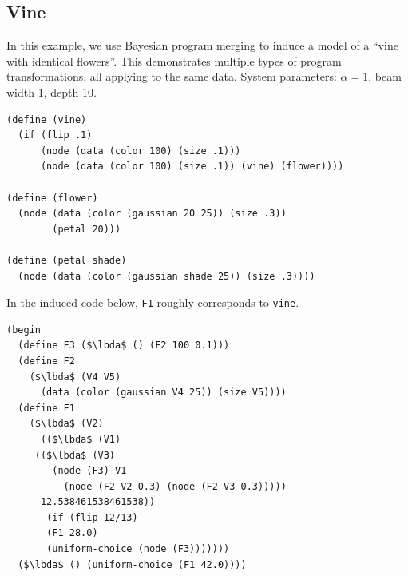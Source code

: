 \documentclass[a4paper,10pt]{article}
\newcommand{\lbda}{\color[rgb]{0,.3,.7} \lambda}
\begin{document}
\subsection{Vine}
In this example, we use Bayesian program merging to induce a model of a ``vine with identical flowers''. This demonstrates multiple types of program transformations, all applying to the same data. System parameters: $\alpha=1$, beam width 1, depth 10.
\begin{lstlisting}[mathescape=true]
(define (vine)
  (if (flip .1)
      (node (data (color 100) (size .1)))
      (node (data (color 100) (size .1)) (vine) (flower))))

(define (flower)
  (node (data (color (gaussian 20 25)) (size .3))
        (petal 20)))

(define (petal shade)
  (node (data (color (gaussian shade 25)) (size .3))))
\end{lstlisting}
In the induced code below, \texttt{F1} roughly corresponds to \texttt{vine}. 
\begin{lstlisting}[mathescape=true]
(begin
  (define F3 ($\lbda$ () (F2 100 0.1)))
  (define F2
    ($\lbda$ (V4 V5)
      (data (color (gaussian V4 25)) (size V5))))
  (define F1
    ($\lbda$ (V2)
      (($\lbda$ (V1)
	 (($\lbda$ (V3)
	    (node (F3) V1
		  (node (F2 V2 0.3) (node (F2 V3 0.3)))))
	  12.538461538461538))
       (if (flip 12/13)
	   (F1 28.0)
	   (uniform-choice (node (F3)))))))
  ($\lbda$ () (uniform-choice (F1 42.0))))
\end{lstlisting}
\end{document}
